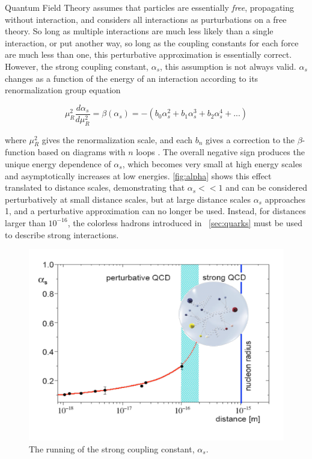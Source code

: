 
Quantum Field Theory assumes that particles are essentially \textit{free}, propagating without interaction, and considers all interactions as purturbations on a free theory. So long as multiple interactions are much less likely than a single interaction, or put another way, so long as the coupling constants for each force are much less than one, this perturbative approximation is essentially correct. However, the strong coupling constant, $\alpha_s$, this assumption is not always valid. $\alpha_s$ changes as a function of the energy of an interaction according to its renormalization group equation

\begin{equation}
\mu^2_R \frac{d\alpha_s}{d\mu^2_R} = \beta(\alpha_s) = -(b_0\alpha_s^2 + b_1\alpha_s^3 + b_2\alpha_s^4 + ... )
\end{equation}

where $\mu^2_R$ gives the renormalization scale, and each $b_n$ gives a correction to the $\beta$-function based on diagrams with $n$ loops \cite{Agashe:2014kda}. The overall negative sign produces the unique energy dependence of $\alpha_s$, which becomes very small at high energy scales and asymptotically increases at low energies. \autoref{fig:alpha} shows this effect translated to distance scales, demonstrating that $\alpha_s<<1$ and can be considered perturbatively at small distance scales, but at large distance scales $\alpha_s$ approaches 1, and a perturbative approximation can no longer be used. Instead, for distances larger than $10^{-16}$, the colorless hadrons introduced in ~\autoref{sec:quarks} must be used to describe strong interactions.

\begin{centering}
\begin{figure}[!htb]
\myfloatalign
\includegraphics[width=.85\linewidth]{figures/theory/strong_coupling.png}
\caption{The running of the strong coupling constant, $\alpha_s$. \cite{Messchendorp:2013ysj}}
\label{fig:alpha}
\end{figure}
\end{centering}

